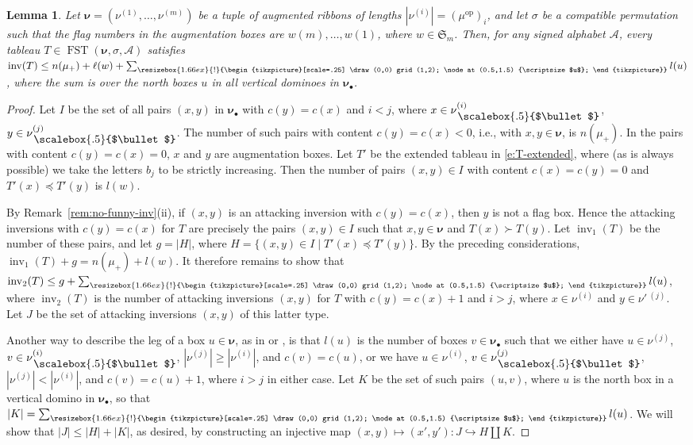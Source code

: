 \documentclass[12pt]{amsart}
\newtheorem{lemma}[thm]{Lemma}
\theoremstyle{definition}
\theoremstyle{remark}
\newcommand{\nubold}{{\boldsymbol \nu }}
\newcommand{\Sfrak}{{\mathfrak S}}
\newcommand{\Acal}{{\mathcal A}}
\newcommand{\sgngt}{\succ}
\newcommand{\sgnle}{\preccurlyeq}
\newcommand{\baug}{\bullet }
\newcommand{\aug}{\raisebox{.12ex}{\scalebox{.5}{$\baug $}}}
\newcommand{\domino}{\begin{tikzpicture}[scale=.25]
\draw (0,0) grid (1,2);
\node at (0.5,1.5) {\scriptsize $u$};
\end{tikzpicture}}
\newcommand{\smalldomino}{\resizebox{1.66ex}{!}{\domino}}
\DeclareMathOperator{\inv}{inv}
\DeclareMathOperator{\FSST}{FST}
\DeclareMathOperator{\op}{op}
\begin{document}
\begin{lemma}\label{lem:inv-bound}
Let $\nubold = (\nu ^{(1)}, \ldots, \nu ^{(m)}) $ be a tuple of
augmented ribbons of lengths $|\nu ^{(i)}| = (\mu ^{\op })_{i}$, and
let $\sigma $ be a compatible permutation such that the flag numbers
in the augmentation boxes are $w(m),\ldots,w(1)$, where $w\in \Sfrak
_{m}$.  Then, for any signed alphabet $\Acal $, every tableau $T\in
\FSST (\nubold ,\sigma ,\Acal )$ satisfies $\inv (T)\leq n(\mu _{+}) +
\ell (w) + \sum _{\smalldomino } l(u)$, where the sum
is over the north boxes $u$ in all vertical dominoes in $\nubold
_{\baug }$.
\end{lemma}

\begin{proof}
Let $I$ be the set of all pairs $(x,y)$ in $\nubold _{\baug }$ with
$c(y) = c(x)$ and $i<j$, where $x\in \nu _{\, \aug } ^{(i)}$, $y\in
\nu _{\, \aug } ^{(j)}$.  The number of such pairs with content $c(y)
= c(x) <0$, i.e., with $x,y\in \nubold $, is $n(\mu _{+})$.  In the
pairs with content $c(y) = c(x) =0$, $x$ and $y$ are augmentation
boxes.  Let $T'$ be the extended tableau in \eqref{e:T-extended},
where (as is always possible) we take the letters $b_{j}$ to be
strictly increasing.  Then the number of pairs $(x,y)\in I$ with
content $c(x) = c(y) = 0$ and $T'(x)\sgnle T'(y)$ is $l(w)$.

By Remark~\ref{rem:no-funny-inv}(ii), if $(x,y)$ is an attacking
inversion with $c(y) = c(x)$, then $y$ is not a flag box.  Hence the
attacking inversions with $c(y) = c(x)$ for $T$ are precisely the
pairs $(x,y)\in I$ such that $x,y\in \nubold $ and $T(x)\sgngt T(y)$.
Let $\inv _{1}(T)$ be the number of these pairs, and let $g = |H|$,
where $H = \{(x,y) \in I\mid T'(x) \sgnle T'(y) \}$.  By the preceding
considerations, $\inv _{1}(T) + g = n(\mu _{+}) + l(w)$.  It therefore
remains to show that $\inv _{2}(T) \leq g + \sum _{\smalldomino }
l(u)$, where $\inv _{2}(T)$ is the number of attacking inversions
$(x,y)$ for $T$ with $c(y) = c(x)+1$ and $i>j$, where $x\in \nu
^{(i)}$ and $y\in \nu '\, ^{(j)}$.  Let $J$ be the set of attacking
inversions $(x,y)$ of this latter type.

Another way to describe the leg of a box $u \in \nubold $, as in
\cite[\S 5]{Knop97} or \cite[\S 4]{KnopSahi97}, is that $l(u)$ is the
number of boxes $v \in \nubold _{\baug }$ such that we either have
$u\in \nu ^{(j)}$, $v\in \nu _{\, \aug }^{(i)}$, $|\nu ^{(j)}| \geq
|\nu ^{(i)}|$, and $c(v) = c(u)$, or we have $u\in \nu ^{(i)}$, $v\in
\nu _{\, \aug }^{(j)}$, $|\nu ^{(j)}| < |\nu ^{(i)}|$, and $c(v) =
c(u)+1$, where $i>j$ in either case.  Let $K$ be the set of such pairs
$(u,v)$, where $u$ is the north box in a vertical domino in $\nubold
_{\baug }$, so that $|K| = \sum _{\smalldomino } l(u)$.  We will show
that $|J|\leq |H|+|K|$, as desired, by constructing an injective map
$(x,y)\mapsto (x',y')\colon J\hookrightarrow H\coprod K $.


\end{proof}
\end{document}
